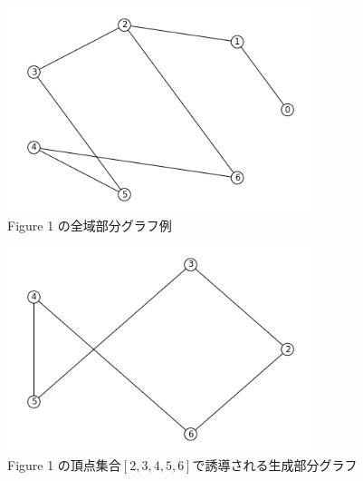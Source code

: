 \documentclass{report}
\begin{document}
\begin{CJK}{UTF8}{min}
    \begin{figure}[!h]
        \centerline{\includegraphics[width=0.8\textwidth]{data/3.png}}
        \caption{Figure 1 の全域部分グラフ例}
    \end{figure}

    \begin{figure}[!h]
        \centerline{\includegraphics[width=0.8\textwidth]{data/4.png}}
        \caption{Figure 1 の頂点集合$[2,3,4,5,6]$で誘導される生成部分グラフ}
    \end{figure}

    \clearpage

\end{CJK}
\end{document}
